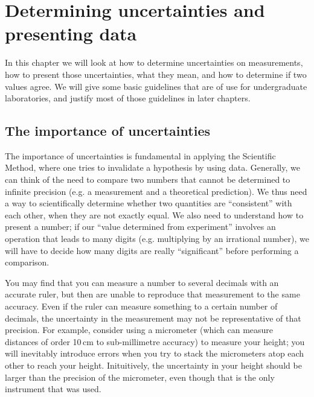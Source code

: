 %
\chapter{Determining uncertainties and presenting data}
In this chapter we will look at how to determine uncertainties on measurements, how to present those uncertainties, what they mean, and how to determine if two values agree. We will give some basic guidelines that are of use for undergraduate laboratories, and justify most of those guidelines in later chapters.

\section{The importance of uncertainties}
The importance of uncertainties is fundamental in applying the Scientific Method, where one tries to invalidate a hypothesis by using data. Generally, we can think of the need to compare two numbers that cannot be determined to infinite precision (e.g. a measurement and a theoretical prediction). We thus need a way to scientifically determine whether two quantities are ``consistent'' with each other, when they are not exactly equal. We also need to understand how to present a number; if our ``value determined from experiment'' involves an operation that leads to many digits (e.g. multiplying by an irrational number), we will have to decide how many digits are really ``significant'' before performing a comparison.

You may find that you can measure a number to several decimals with an accurate ruler, but then are unable to reproduce that measurement to the same accuracy. Even if the ruler can measure something to a certain number of decimals, the uncertainty in the measurement may not be representative of that precision. For example, consider using a micrometer (which can measure distances of order 10\,cm to sub-millimetre accuracy) to measure your height; you will inevitably introduce errors when you try to stack the micrometers atop each other to reach your height. Inituitively, the uncertainty in your height should be larger than the precision of the micrometer, even though that is the only instrument that was used.
 
